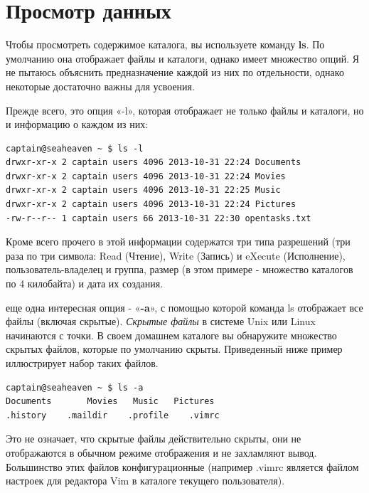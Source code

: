 \documentclass[10pt]{book}
\begin{document}
\section{Просмотр данных}

Чтобы просмотреть содержимое каталога, вы используете команду \textbf{ls}. По умолчанию она отображает файлы и каталоги, однако имеет множество опций. Я не пытаюсь объяснить предназначение каждой из них по отдельности, однако некоторые достаточно важны для усвоения.

Прежде всего, это опция «-l», которая отображает не только файлы и каталоги, но и информацию о каждом из них:

\vspace{3mm}
\begin{tcolorbox}
\begin{lstlisting}
captain@seaheaven ~ $ ls -l
drwxr-xr-x 2 captain users 4096 2013-10-31 22:24 Documents
drwxr-xr-x 2 captain users 4096 2013-10-31 22:24 Movies
drwxr-xr-x 2 captain users 4096 2013-10-31 22:25 Music
drwxr-xr-x 2 captain users 4096 2013-10-31 22:24 Pictures
-rw-r--r-- 1 captain users 66 2013-10-31 22:30 opentasks.txt
\end{lstlisting}
\end{tcolorbox}

Кроме всего прочего в этой информации содержатся три типа разрешений (три раза по три символа: Read (Чтение), Write (Запись) и eXecute (Исполнение), пользо\-ватель-владелец и группа, размер (в этом примере - множество каталогов по 4 килобайта) и дата их создания.

еще одна интересная опция - «\textbf{-a}», с помощью которой команда ls отображает все файлы (включая скрытые). \emph{Скрытые файлы} в системе Unix или Linux начинаются с точки. В своем домашнем каталоге вы обнаружите множество скрытых файлов, которые по умолчанию скрыты. Приведенный ниже пример иллюстрирует набор таких файлов.

\vspace{3mm}
\begin{tcolorbox}
\begin{lstlisting}
captain@seaheaven ~ $ ls -a
Documents 		Movies	 Music	 Pictures
.history 	.maildir 	.profile 	.vimrc
\end{lstlisting}
\end{tcolorbox}

Это не означает, что скрытые файлы действительно скрыты, они не отображаются в обычном режиме отображения и не захламляют вывод. Большинство этих файлов конфигурационные (например .vimrc является файлом настроек для редактора Vim в каталоге текущего пользователя). 
\end{document}
